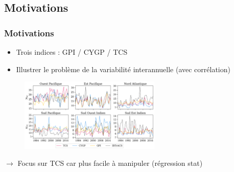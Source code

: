 \documentclass[aspectratio=169, usepdftitle=false, xcolor={dvipsnames}, 9pt,table]{beamer}
\begin{document}

\subsection*{Motivations}
\begin{frame}
    \frametitle{Motivations}
    \begin{itemize}
        \item Trois indices : GPI / CYGP / TCS
        \item Illustrer le problème de la variabilité interannuelle (avec corrélation)
    \end{itemize} 
    \begin{figure}
        \centering
        \includegraphics[width=0.6\textwidth]{Figures/tcs_cygp_gpi_interannual.png}
    \end{figure}
    $\longrightarrow$ Focus sur TCS car plus facile à manipuler (régression stat)
\end{frame}

\end{document}
